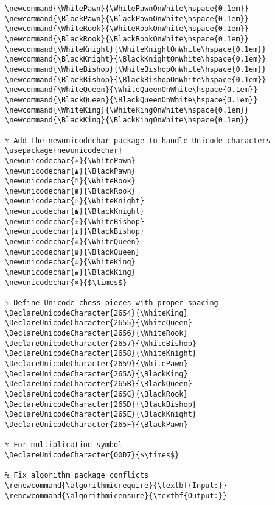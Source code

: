 \documentclass[11pt]{article}
\renewcommand{\algorithmicrequire}{\textbf{Input:}}
\renewcommand{\algorithmicensure}{\textbf{Output:}}
\begin{document}
\begin{lstlisting}[style=Python]
% Define chess piece symbols with proper spacing
\newcommand{\WhitePawn}{\WhitePawnOnWhite\hspace{0.1em}}
\newcommand{\BlackPawn}{\BlackPawnOnWhite\hspace{0.1em}}
\newcommand{\WhiteRook}{\WhiteRookOnWhite\hspace{0.1em}}
\newcommand{\BlackRook}{\BlackRookOnWhite\hspace{0.1em}}
\newcommand{\WhiteKnight}{\WhiteKnightOnWhite\hspace{0.1em}}
\newcommand{\BlackKnight}{\BlackKnightOnWhite\hspace{0.1em}}
\newcommand{\WhiteBishop}{\WhiteBishopOnWhite\hspace{0.1em}}
\newcommand{\BlackBishop}{\BlackBishopOnWhite\hspace{0.1em}}
\newcommand{\WhiteQueen}{\WhiteQueenOnWhite\hspace{0.1em}}
\newcommand{\BlackQueen}{\BlackQueenOnWhite\hspace{0.1em}}
\newcommand{\WhiteKing}{\WhiteKingOnWhite\hspace{0.1em}}
\newcommand{\BlackKing}{\BlackKingOnWhite\hspace{0.1em}}

% Add the newunicodechar package to handle Unicode characters
\usepackage{newunicodechar}
\newunicodechar{♙}{\WhitePawn}
\newunicodechar{♟}{\BlackPawn}
\newunicodechar{♖}{\WhiteRook}
\newunicodechar{♜}{\BlackRook}
\newunicodechar{♘}{\WhiteKnight}
\newunicodechar{♞}{\BlackKnight}
\newunicodechar{♗}{\WhiteBishop}
\newunicodechar{♝}{\BlackBishop}
\newunicodechar{♕}{\WhiteQueen}
\newunicodechar{♛}{\BlackQueen}
\newunicodechar{♔}{\WhiteKing}
\newunicodechar{♚}{\BlackKing}
\newunicodechar{×}{$\times$}

% Define Unicode chess pieces with proper spacing
\DeclareUnicodeCharacter{2654}{\WhiteKing}
\DeclareUnicodeCharacter{2655}{\WhiteQueen}
\DeclareUnicodeCharacter{2656}{\WhiteRook}
\DeclareUnicodeCharacter{2657}{\WhiteBishop}
\DeclareUnicodeCharacter{2658}{\WhiteKnight}
\DeclareUnicodeCharacter{2659}{\WhitePawn}
\DeclareUnicodeCharacter{265A}{\BlackKing}
\DeclareUnicodeCharacter{265B}{\BlackQueen}
\DeclareUnicodeCharacter{265C}{\BlackRook}
\DeclareUnicodeCharacter{265D}{\BlackBishop}
\DeclareUnicodeCharacter{265E}{\BlackKnight}
\DeclareUnicodeCharacter{265F}{\BlackPawn}

% For multiplication symbol
\DeclareUnicodeCharacter{00D7}{$\times$}

% Fix algorithm package conflicts
\renewcommand{\algorithmicrequire}{\textbf{Input:}}
\renewcommand{\algorithmicensure}{\textbf{Output:}}


\end{lstlisting}
\end{document}

